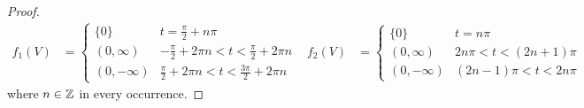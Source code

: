 \documentclass[../psets.tex]{subfiles}
\begin{document}
\begin{enumerate}[label={\textbf{\arabic*.}}]
\begin{enumerate}
\begin{proof}
            \begin{align*}
                f_1(V) &=
                \begin{cases}
                    \{0\} & t=\frac{\pi}{2}+n\pi\\
                    (0,\infty) & -\frac{\pi}{2}+2\pi n<t<\frac{\pi}{2}+2\pi n\\
                    (0,-\infty) & \frac{\pi}{2}+2\pi n<t<\frac{3\pi}{2}+2\pi n
                \end{cases}&
                f_2(V) &=
                \begin{cases}
                    \{0\} & t=n\pi\\
                    (0,\infty) & 2n\pi<t<(2n+1)\pi\\
                    (0,-\infty) & (2n-1)\pi<t<2n\pi
                \end{cases}
            \end{align*}
            where $n\in\mathbb{Z}$ in every occurrence.
        \end{proof}
    \end{enumerate}
\end{enumerate}
\end{document}
